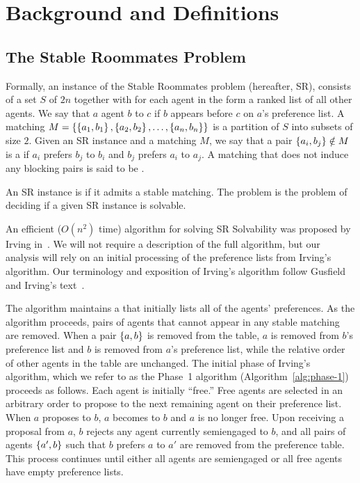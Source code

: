 \section{Background and Definitions}

\subsection{The Stable Roommates Problem}\label{sec:sr}

Formally, an instance of the Stable Roommates problem (hereafter, SR), consists of a set $S$ of $2n$  together with  for each agent in the form a ranked list of all other agents. We say that $a$  agent $b$ to $c$ if $b$ appears before $c$ on $a$'s preference list. A matching $M = \left\{\left\{a_1, b_1\right\}, \left\{a_2, b_2\right\}, \ldots, \left\{a_n, b_n\right\}\right\}$ is a partition of $S$ into subsets of size $2$. Given an SR instance and a matching $M$, we say that a pair $\left\{a_i, b_j\right\} \notin M$ is a  if $a_i$ prefers $b_j$ to $b_i$ and $b_j$ prefers $a_i$ to $a_j$. A matching that does not induce any blocking pairs is said to be .

An SR instance is  if it admits a stable matching. The  problem is the problem of deciding if a given SR instance is solvable.

An efficient ($O(n^2)$ time) algorithm for solving SR Solvability was proposed by Irving in~\cite{Irving1985-stable}. We will not require a description of the full algorithm, but our analysis will rely on an initial processing of the preference lists from Irving's algorithm. Our terminology and exposition of Irving's algorithm follow Gusfield and Irving's text~\cite[Chapter~4]{GI89}. 

The algorithm maintains a  that initially lists all of the agents' preferences. As the algorithm proceeds, pairs of agents that cannot appear in any stable matching are removed. When a pair $\left\{a, b\right\}$ is removed from the table, $a$ is removed from $b$'s preference list and $b$ is removed from $a$'s preference list, while the relative order of other agents in the table are unchanged. The initial phase of Irving's algorithm, which we refer to as the Phase~1 algorithm (Algorithm~\ref{alg:phase-1}) proceeds as follows. Each agent is initially ``free.'' Free agents are selected in an arbitrary order to propose to the next remaining agent on their preference list. When $a$ proposes to $b$, $a$ becomes  to $b$ and $a$ is no longer free. Upon receiving a proposal from $a$, $b$ rejects any agent currently semiengaged to $b$, and all pairs of agents $\left\{a', b\right\}$ such that $b$ prefers $a$ to $a'$ are removed from the preference table. This process continues until either all agents are semiengaged or all free agents have empty preference lists.


